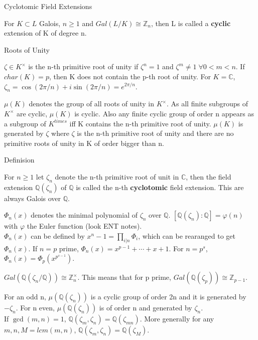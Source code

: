 \documentclass[12pt, letterpaper]{article}
\newcommand{\C}{\mathbb{C}}
\newcommand{\Q}{\mathbb{Q}}
\newcommand{\Z}{\mathbb{Z}}
\begin{document}
\begin{section}{Cyclotomic Field Extensions}

  For \(K \subset L\) Galois, \(n \geq 1\) and \(Gal(L / K) \cong \Z_{n}\),
  then L is called a \textbf{cyclic} extension of K of degree n.

  \begin{subsection}{Roots of Unity}

    \(\zeta \in K^{\times}\) is the n-th primitive root of unity if \(\zeta^{n}
    = 1\) and \(\zeta^{m} \neq 1 \; \forall 0 < m < n\). If \(char(K) = p\),
    then K does not contain the p-th root of unity. For \(K = \C\),
    \(\zeta_{n} = \cos(2 \pi / n) + i \sin(2 \pi / n) = e^{2 \pi / n}\).

    \(\mu(K)\) denotes the group of all roots of unity in \(K^{\times}\).
    As all finite subgroups of \(K^{\times}\) are cyclic, \(\mu(K)\) is cyclic.
    Also any finite cyclic group of order n appears as a subgroup of
    \(K^{times}\) iff K contains the n-th primitive root of unity. \(\mu(K)\)
    is generated by \(\zeta\) where \(\zeta\) is the n-th primitive root of
    unity and there are no primitive roots of unity in K of order bigger than
    n.

  \end{subsection}

  \begin{subsection}{Definision}

    For \(n \geq 1\) let \(\zeta_{n}\) denote the n-th primitive root of unit
    in \(\C\), then the field extension \(\Q(\zeta_{n})\) of \(\Q\) is called
    the n-th \textbf{cyclotomic} field extension. This are always Galois over
    \(\Q\).

    \(\Phi_{n}(x)\) denotes the minimal polynomial of \(\zeta_{n}\) over
    \(\Q\). \([\Q(\zeta_{n}) : \Q] = \varphi(n)\) with \(\varphi\) the Euler
    function (look ENT notes). \\
    \(\Phi_{n}(x)\) can be defined by \(x^{n} - 1 = \prod_{i | n} \Phi_{i}\),
    which can be rearanged to get \(\Phi_{n}(x)\). If \(n = p\) prime,
    \(\Phi_{n}(x) = x^{p - 1} + \cdots + x + 1\). For \(n = p^{s}\),
    \(\Phi_{n}(x) = \Phi_{p}(x^{p^{s - 1}})\).

    \(Gal(\Q(\zeta_{n} / \Q)) \cong \Z^{\times}_{n}\). This means that for p
    prime, \(Gal(\Q(\zeta_{p})) \cong \Z_{p - 1}\).

    For an odd n, \(\mu(\Q(\zeta_{n}))\) is a cyclic group of order 2n and it
    is generated by \(-\zeta_{n}\). For n even, \(\mu(\Q(\zeta_{n}))\) is of
    order n and generated by \(\zeta_{n}\). \\
    If \(\gcd(m, n) = 1\), \(\Q(\zeta_{m}, \zeta_{n}) = \Q(\zeta_{mn})\). More
    generally for any \(m, n, M = lcm(m, n)\), \(\Q(\zeta_{m}, \zeta_{n}) =
    \Q(\zeta_{M})\).


\end{subsection}
\end{section}
\end{document}
